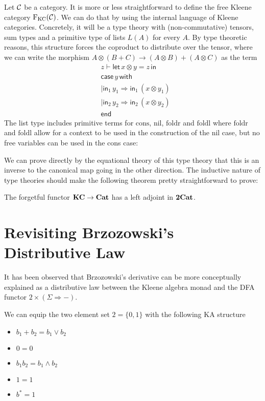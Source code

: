 \documentclass[acmsmall,anonymous,review,screen]{acmart}
\newcommand{\cat}[1]{
  \relax
  \StrLen{#1}[\arglength]
  \ifnum\arglength=1
  \mathcal{#1}
  \else
  \mathbf{#1}
  \fi
}
\newcommand{\FKC}{\textrm{F}_{\textrm{KC}}}
\begin{document}
Let $\cat{C}$ be a category. It is more or less straightforward to
define the free Kleene category $\FKC(\cat{C})$. We can do that by
using the internal language of Kleene categories. Concretely, it
will be a type theory with (non-commutative) tensors, sum types and
a primitive type of lists $L(A)$ for every $A$. By type theoretic reasons, this
structure forces the coproduct to distribute over the tensor, where we
can write the morphism $A \otimes (B + C) \to (A \otimes B) + (A
\otimes C) $ as the term
\begin{align*}
  &z \vdash \mathsf{let}\, x \otimes y = z\, \mathsf{in}\\
  &\mathsf{case}\, y \, \mathsf{with}\\
  &| \mathsf{in}_1\, y_1 \Rightarrow \mathsf{in}_1\, (x \otimes y_1)\\
  &| \mathsf{in}_2\,y_2\Rightarrow \mathsf{in}_2 \,(x \otimes y_2)\\
  &\mathsf{end}
\end{align*}
%
The list type includes primitive terms for $\textrm{cons}$,
$\textrm{nil}$, $\textrm{foldr}$ and $\textrm{foldl}$ where
$\textrm{foldr}$ and $\textrm{foldl}$ allow for a context to be used
in the construction of the nil case, but no free variables can be used
in the cons case:

We can prove directly by the equational theory of this type theory
that this is an inverse to the canonical map going in the other
direction. The inductive nature of type theories should make the
following theorem pretty straightforward to prove:
%
\begin{theorem}
  The forgetful functor $\cat{KC} \to \cat{Cat}$ has a left adjoint
  in $\cat{2Cat}$.
\end{theorem}

\section{Revisiting Brzozowski's Distributive Law}

It has been observed that Brzozowski's derivative can be more conceptually
explained as a distributive law between the Kleene algebra monad and the
DFA functor $2 \times (\Sigma \Rightarrow -)$.

\begin{definition}
  We can equip the two element set $2 = \{0, 1 \}$ with the following KA structure
  \begin{itemize}
    \item $b_1 + b_2 = b_1 \lor b_2$
    \item $0 = 0$
    \item $b_1 b_2 = b_1 \land b_2$
    \item $1 = 1$
    \item $b^* = 1$
  \end{itemize}
\end{definition}
\end{document}
